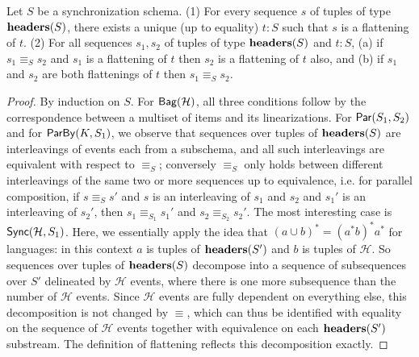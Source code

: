 \begin{proposition}
\label{45:prop:sps-sequence-correspondence}
Let $S$ be a synchronization schema.
(1) For every sequence $s$ of tuples of type $\mathbf{headers}(S)$, there exists a unique (up to equality) $t : S$ such that $s$ is a flattening of $t$.
(2) For all sequences $s_1, s_2$ of tuples of type $\mathbf{headers}(S)$ and $t : S$,
(a) if $s_1 \equiv_{S} s_2$ and $s_1$ is a flattening of  $t$ then $s_2$ is a flattening of $t$ also, and
(b) if $s_1$ and $s_2$ are both flattenings of $t$ then $s_1 \equiv_{S} s_2$.
\end{proposition}
\begin{proof}
By induction on $S$.
For $\mathsf{Bag}({\mathcal{H}})$,
all three conditions follow by the correspondence between a multiset of items and its linearizations.
For $\mathsf{Par}({S_1}, {S_2})$
and for $\mathsf{ParBy}({K}, S_1)$,
we observe that sequences over tuples of $\mathbf{headers}(S)$ are interleavings of events each from a subschema,
and all such interleavings are equivalent with respect to $\equiv_{S}$;
conversely $\equiv_{S}$ only holds between different interleavings of the same two or more sequences up to equivalence, i.e. for parallel composition, if $s \equiv_{S} s'$ and $s$ is an interleaving of $s_1$ and $s_2$ and $s_1'$ is an interleaving of $s_2'$, then $s_1 \equiv_{S_1} s_1'$ and $s_2 \equiv_{S_2} s_2'$.
The most interesting case is $\mathsf{Sync}({\mathcal{H}}, S_1)$.
Here, we essentially apply the idea that $(a \cup b)^{*} = (a^{*} b)^{*} a^{*}$ for languages: in this context $a$ is tuples of $\mathbf{headers}(S')$ and $b$ is tuples of $\mathcal{H}$.
So sequences over  tuples of $\mathbf{headers}(S)$ decompose into a sequence of subsequences over $S'$ delineated by $\mathcal{H}$ events, where there is one more subsequence than the number of $\mathcal{H}$ events.
Since $\mathcal{H}$ events are fully dependent on everything else, this decomposition is not changed by $\equiv$, which can thus be identified with equality on the sequence of $\mathcal{H}$ events together with equivalence on each $\mathbf{headers}(S')$ substream.
The definition of flattening reflects this decomposition exactly.
\end{proof}

